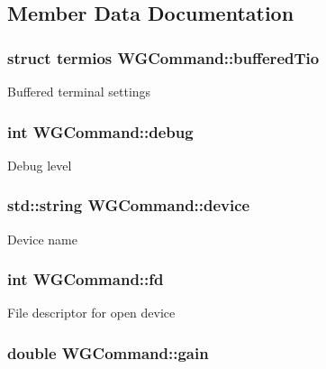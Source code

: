 \subsection{Member Data Documentation}
\hypertarget{classWGCommand_aa87ce887cb2d9c80cfe87efd84fa4362}{
\subsubsection[{buffered\-Tio}]{\setlength{\rightskip}{0pt plus 5cm}struct termios W\-G\-Command\-::buffered\-Tio\hspace{0.3cm}{\ttfamily [private]}}}\label{classWGCommand_aa87ce887cb2d9c80cfe87efd84fa4362}
Buffered terminal settings \hypertarget{classWGCommand_a2e554051536b4ee562c3ccd49071e0be}{
\subsubsection[{debug}]{\setlength{\rightskip}{0pt plus 5cm}int W\-G\-Command\-::debug\hspace{0.3cm}{\ttfamily [private]}}}\label{classWGCommand_a2e554051536b4ee562c3ccd49071e0be}
Debug level \hypertarget{classWGCommand_ad87845443f95cc2d0fb33299a13de26b}{
\subsubsection[{device}]{\setlength{\rightskip}{0pt plus 5cm}std\-::string W\-G\-Command\-::device\hspace{0.3cm}{\ttfamily [private]}}}\label{classWGCommand_ad87845443f95cc2d0fb33299a13de26b}
Device name \hypertarget{classWGCommand_a6f4376a362141d0f49efe521156d838b}{
\subsubsection[{fd}]{\setlength{\rightskip}{0pt plus 5cm}int W\-G\-Command\-::fd\hspace{0.3cm}{\ttfamily [private]}}}\label{classWGCommand_a6f4376a362141d0f49efe521156d838b}
File descriptor for open device \hypertarget{classWGCommand_a48891c9df29d1988fe828bb18906bf89}{
\subsubsection[{gain}]{\setlength{\rightskip}{0pt plus 5cm}double W\-G\-Command\-::gain\hspace{0.3cm}{\ttfamily [private]}}}\label{classWGCommand_a48891c9df29d1988fe828bb18906bf89}
